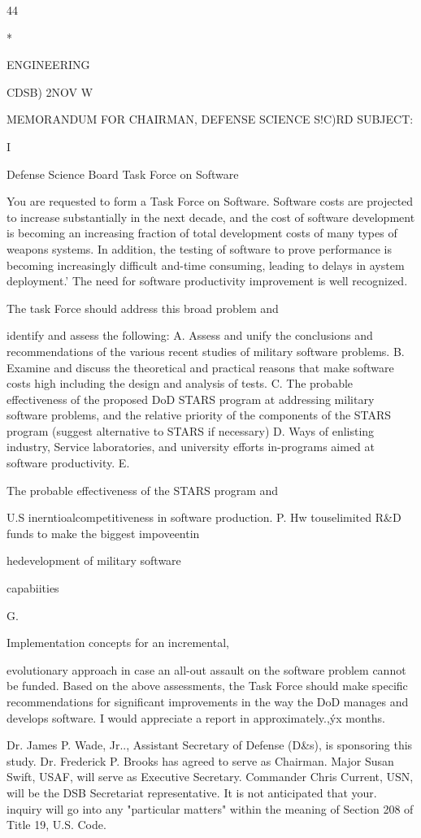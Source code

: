 \documentclass[12pt]{article}
\begin{document}
44

*

ENGINEERING

CDSB)
2NOV W

MEMORANDUM FOR CHAIRMAN, DEFENSE SCIENCE S!C)RD
SUBJECT:

I

Defense Science Board Task Force on Software

You are requested to form a Task Force on Software.
Software costs are projected to increase substantially in the
next decade, and the cost of software development is becoming an
increasing fraction of total development costs of many types of
weapons systems. In addition, the testing of software to prove
performance is becoming increasingly difficult and-time
consuming, leading to delays in aystem deployment.' The need for
software productivity improvement is well recognized.

The task Force should address this broad problem and

identify and assess the following:
A.
Assess and unify the conclusions and recommendations
of the various recent studies of military software problems.
B.
Examine and discuss the theoretical and practical
reasons that make software costs high including the design and
analysis of tests.
C.
The probable effectiveness of the proposed DoD STARS
program at addressing military software problems, and the
relative priority of the components of the STARS program
(suggest alternative to STARS if necessary)
D. Ways of enlisting industry, Service laboratories, and
university efforts in-programs aimed at software productivity.
E.

The probable effectiveness of the STARS program and

U.S
inerntioalcompetitiveness in software production.
P.
Hw touselimited R\&D funds to make the biggest
impoveentin

hedevelopment of military software

capabiities

G.

Implementation concepts for an incremental,

evolutionary approach in case an all-out assault on the software
problem cannot be funded.
Based on the above assessments, the Task Force should make
specific recommendations for significant improvements in the way
the DoD manages and develops software.
I would appreciate a
report in approximately.,ýx months.

Dr. James P. Wade, Jr.., Assistant Secretary of Defense
(D\&s), is sponsoring this study. Dr. Frederick P. Brooks has
agreed to serve as Chairman.
Major Susan Swift, USAF, will
serve as Executive Secretary.
Commander Chris Current, USN,
will be the DSB Secretariat representative.
It is not
anticipated that your. inquiry will go into any "particular
matters" within the meaning of Section 208 of Title 19,
U.S. Code.
\end{document}
